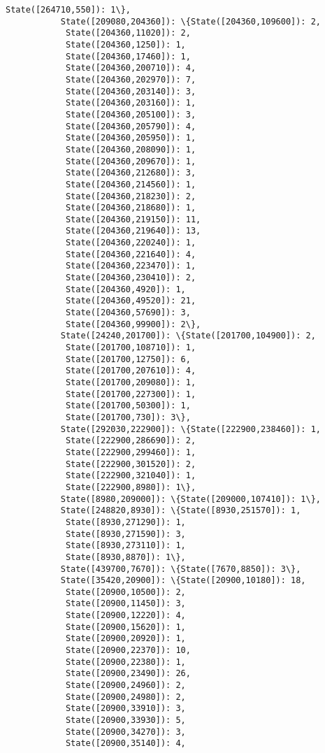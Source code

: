 \documentclass[11pt]{article}
\begin{document}
\begin{Verbatim}[commandchars=\\\{\}]
            State([264710,550]): 1\},
           State([209080,204360]): \{State([204360,109600]): 2,
            State([204360,11020]): 2,
            State([204360,1250]): 1,
            State([204360,17460]): 1,
            State([204360,200710]): 4,
            State([204360,202970]): 7,
            State([204360,203140]): 3,
            State([204360,203160]): 1,
            State([204360,205100]): 3,
            State([204360,205790]): 4,
            State([204360,205950]): 1,
            State([204360,208090]): 1,
            State([204360,209670]): 1,
            State([204360,212680]): 3,
            State([204360,214560]): 1,
            State([204360,218230]): 2,
            State([204360,218680]): 1,
            State([204360,219150]): 11,
            State([204360,219640]): 13,
            State([204360,220240]): 1,
            State([204360,221640]): 4,
            State([204360,223470]): 1,
            State([204360,230410]): 2,
            State([204360,4920]): 1,
            State([204360,49520]): 21,
            State([204360,57690]): 3,
            State([204360,99900]): 2\},
           State([24240,201700]): \{State([201700,104900]): 2,
            State([201700,108710]): 1,
            State([201700,12750]): 6,
            State([201700,207610]): 4,
            State([201700,209080]): 1,
            State([201700,227300]): 1,
            State([201700,50300]): 1,
            State([201700,730]): 3\},
           State([292030,222900]): \{State([222900,238460]): 1,
            State([222900,286690]): 2,
            State([222900,299460]): 1,
            State([222900,301520]): 2,
            State([222900,321040]): 1,
            State([222900,8980]): 1\},
           State([8980,209000]): \{State([209000,107410]): 1\},
           State([248820,8930]): \{State([8930,251570]): 1,
            State([8930,271290]): 1,
            State([8930,271590]): 3,
            State([8930,273110]): 1,
            State([8930,8870]): 1\},
           State([439700,7670]): \{State([7670,8850]): 3\},
           State([35420,20900]): \{State([20900,10180]): 18,
            State([20900,10500]): 2,
            State([20900,11450]): 3,
            State([20900,12220]): 4,
            State([20900,15620]): 1,
            State([20900,20920]): 1,
            State([20900,22370]): 10,
            State([20900,22380]): 1,
            State([20900,23490]): 26,
            State([20900,24960]): 2,
            State([20900,24980]): 2,
            State([20900,33910]): 3,
            State([20900,33930]): 5,
            State([20900,34270]): 3,
            State([20900,35140]): 4,

\end{Verbatim}
\end{document}
